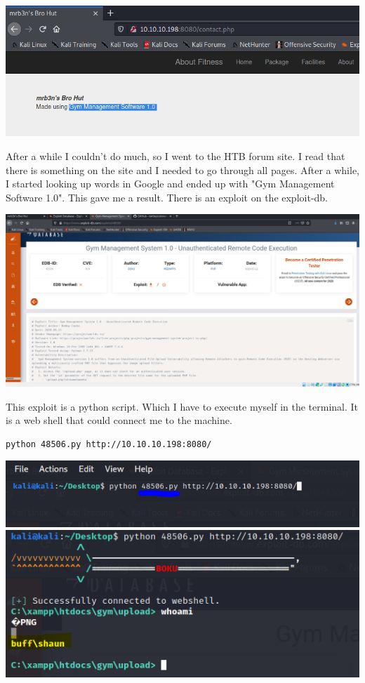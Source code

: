 \documentclass[../main.tex]{subfiles}
\begin{document}
\includegraphics[width=\linewidth]{images/Boyan/HackTheBox_5_Boyan.PNG}

After a while I couldn't do much, so I went to the HTB forum site. I read that there is something on the site and I needed to go through all pages. After a while, I started looking up words in Google and ended up with "Gym Management Software 1.0". This gave me a result. There is an exploit on the exploit-db. 

\includegraphics[width=\linewidth]{images/Boyan/HackTheBox_8_Boyan.PNG}

This exploit is a python script. Which I have to execute myself in the terminal. It is a web shell that could connect me to the machine. 

\begin{lstlisting}
python 48506.py http://10.10.10.198:8080/
\end{lstlisting}

\includegraphics[width=\linewidth]{images/Boyan/HackTheBox_9_Boyan.PNG}
\includegraphics[width=\linewidth]{images/Boyan/HackTheBox_10_Boyan.PNG}
\end{document}
